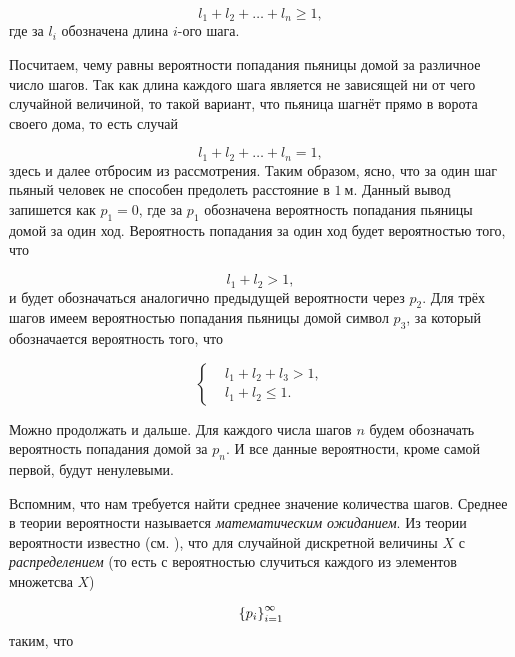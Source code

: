 \documentclass[12pt]{article}
\begin{document}
\begin{equation}
	l_1 + l_2 + \ldots + l_n \ge 1,
\end{equation}
где за $l_i$ обозначена длина $i$\--ого шага.

\par Посчитаем, чему равны вероятности попадания пьяницы домой за различное число шагов. Так как длина каждого шага является не зависящей ни от чего случайной величиной, то такой вариант, что пьяница шагнёт прямо в ворота своего дома, то есть случай 

\begin{equation}
	l_1 + l_2 + \ldots + l_n = 1,
\end{equation}
здесь и далее отбросим из рассмотрения. Таким образом, ясно, что за один шаг пьяный человек не способен предолеть расстояние в $1\ \text{м}$. Данный вывод запишется как $p_1 = 0$, где за $p_1$ обозначена вероятность попадания пьяницы домой за один ход. Вероятность попадания за один ход будет вероятностью того, что 

\begin{equation}
	l_1 + l_2 > 1,
\end{equation}
и будет обозначаться аналогично предыдущей вероятности через $p_2$. Для трёх шагов имеем вероятностью попадания пьяницы домой символ $p_3$, за который обозначается вероятность того, что 

\begin{equation}\label{eq:old}
	\begin{cases}
		& l_1 + l_2 + l_3 > 1,\\
		& l_1 + l_2 \le 1.
	\end{cases}
\end{equation}

Можно продолжать и дальше. Для каждого числа шагов $n$ будем обозначать вероятность попадания домой за $p_n$. И все данные вероятности, кроме самой первой, будут ненулевыми.

\par Вспомним, что нам требуется найти среднее значение количества шагов. Среднее в теории вероятности называется \emph{математическим ожиданием}. Из теории вероятности известно (см. \cite{w1}), что для случайной дискретной величины $X$ с \emph{распределением} (то есть с вероятностью случиться каждого из элементов множетсва $X$)

\begin{equation}
	\qty{p_i}_{i=1}^\infty
\end{equation}
таким, что 
\end{document}
